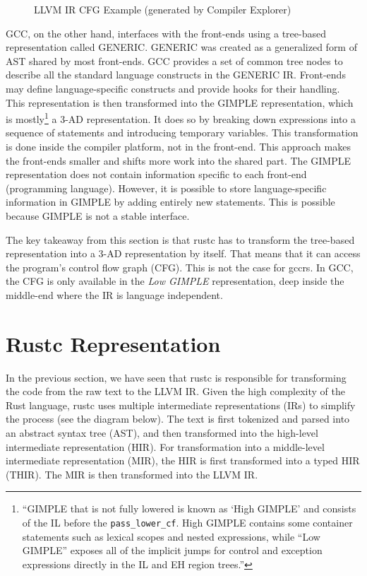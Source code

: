 \documentclass[
  11pt,
  twoside,symmetric]{report}
\begin{document}
\begin{figure}
\centering

\caption{LLVM IR CFG Example (generated by Compiler Explorer)}
\end{figure}

GCC, on the other hand, interfaces with the front-ends using a
tree-based representation called GENERIC. GENERIC was created as a generalized form of AST shared by most
front-ends. GCC provides a set of common tree nodes to describe all the
standard language constructs in the GENERIC IR. Front-ends may define
language-specific constructs and provide hooks for their
handling. This representation is
then transformed into the GIMPLE representation, which is
mostly\footnote{``GIMPLE that is not fully lowered is known as `High
  GIMPLE' and consists of the IL before the \texttt{pass\_lower\_cf}.
  High GIMPLE contains some container statements such as lexical scopes
  and nested expressions, while ``Low GIMPLE'' exposes all of the
  implicit jumps for control and exception expressions directly in the
  IL and EH region trees.''} a
3-AD representation. It does so by breaking down expressions into a
sequence of statements and introducing temporary variables. This
transformation is done inside the compiler platform, not in the
front-end. This approach makes the front-ends smaller and shifts more
work into the shared part. The GIMPLE representation does not contain
information specific to each front-end (programming language). However,
it is possible to store language-specific information in GIMPLE by
adding entirely new statements.
This is possible because GIMPLE is not a stable interface.

The key takeaway from this section is that rustc has to transform the
tree-based representation into a 3-AD representation by itself. That
means that it can access the program's control flow graph (CFG). This is
not the case for gccrs. In GCC, the CFG is only available in the
\emph{Low GIMPLE} representation, deep inside the middle-end where the
IR is language independent.

\section{Rustc Representation}\label{rustc-representation}

In the previous section, we have seen that rustc is responsible for
transforming the code from the raw text to the LLVM IR. Given the high
complexity of the Rust language, rustc uses multiple intermediate
representations (IRs) to simplify the process (see the diagram below).
The text is first tokenized and parsed into an abstract syntax tree
(AST), and then transformed into the high-level intermediate
representation (HIR). For transformation into a middle-level
intermediate representation (MIR), the HIR is first transformed into a
typed HIR (THIR). The MIR is then transformed into the LLVM IR.
\end{document}
